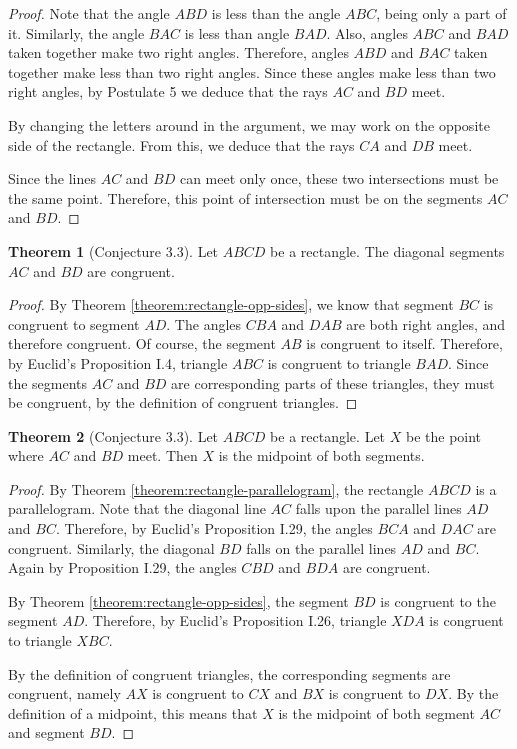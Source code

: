 \documentclass{tufte-handout}
\theoremstyle{definition}
\newtheorem{theorem}{Theorem}[section]
\begin{document}
\begin{proof}
Note that the angle $ABD$ is less than the angle $ABC$, being only a part of it. Similarly, the angle $BAC$ is less than angle $BAD$. Also, angles $ABC$ and $BAD$ taken together make two right angles. Therefore, angles $ABD$ and $BAC$ taken together make less than two right angles. Since these angles make less than two right angles, by Postulate 5 we deduce that the rays $AC$ and $BD$ meet.

By changing the letters around in the argument, we may work on the opposite side of the rectangle. From this, we deduce that the rays $CA$ and $DB$ meet.

Since the lines $AC$ and $BD$ can meet only once, these two intersections must be the same point. Therefore, this point of intersection must be on the segments $AC$ and $BD$.
\end{proof}

\clearpage

\begin{theorem}[Conjecture 3.3]
\label{theorem:rectangle-diags-cong}
Let $ABCD$ be a rectangle. The diagonal segments $AC$ and $BD$ are congruent.
\end{theorem}

\begin{proof}
By Theorem \ref{theorem:rectangle-opp-sides}, we know that segment $BC$ is congruent to segment $AD$. The angles $CBA$ and $DAB$ are both right angles, and therefore congruent. Of course, the segment $AB$ is congruent to itself. Therefore, by Euclid's Proposition I.4, triangle $ABC$ is congruent to triangle $BAD$. Since the segments $AC$ and $BD$ are corresponding parts of these triangles, they must be congruent, by the definition of congruent triangles.
\end{proof}


\begin{theorem}[Conjecture 3.3]
Let $ABCD$ be a rectangle. Let $X$ be the point where $AC$ and $BD$ meet. Then $X$ is the midpoint of both segments.
\end{theorem}

\begin{proof}
By Theorem \ref{theorem:rectangle-parallelogram}, the rectangle $ABCD$ is a parallelogram. Note that the diagonal line $AC$ falls upon the parallel lines $AD$ and $BC$. Therefore, by Euclid's Proposition I.29, the angles $BCA$ and $DAC$ are congruent. Similarly, the diagonal $BD$ falls on the parallel lines $AD$ and $BC$. Again by Proposition I.29, the angles $CBD$ and $BDA$ are congruent.

By Theorem \ref{theorem:rectangle-opp-sides}, the segment $BD$ is congruent to the segment $AD$. Therefore, by Euclid's Proposition I.26, triangle $XDA$ is congruent to triangle $XBC$.

By the definition of congruent triangles, the corresponding segments are congruent, namely $AX$ is congruent to $CX$ and $BX$ is congruent to $DX$. By the definition of a midpoint, this means that $X$ is the midpoint of both segment $AC$ and segment $BD$.

\end{proof}
\end{document}
